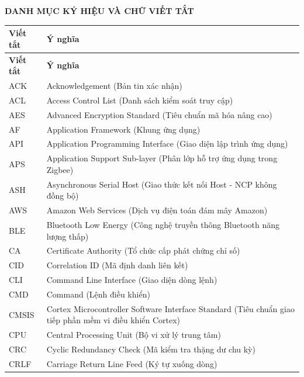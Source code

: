 \begin{center}
{\fontsize{18pt}{22pt}\selectfont\bfseries DANH MỤC KÝ HIỆU VÀ CHỮ VIẾT TẮT}
\end{center}
 {}
\label{sec:acronyms}
\vspace{0.5cm}

\small
\begin{longtable}{|l|p{12cm}|}
\hline
\textbf{Viết tắt} & \textbf{Ý nghĩa} \\ \hline
\endfirsthead
\hline
\textbf{Viết tắt} & \textbf{Ý nghĩa} \\ \hline
\endhead
\hline
\endfoot
ACK & Acknowledgement (Bản tin xác nhận) \\ \hline
ACL & Access Control List (Danh sách kiểm soát truy cập) \\ \hline
AES & Advanced Encryption Standard (Tiêu chuẩn mã hóa nâng cao) \\ \hline
AF & Application Framework (Khung ứng dụng) \\ \hline
API & Application Programming Interface (Giao diện lập trình ứng dụng) \\ \hline
APS & Application Support Sub-layer (Phân lớp hỗ trợ ứng dụng trong Zigbee) \\ \hline
ASH & Asynchronous Serial Host (Giao thức kết nối Host - NCP không đồng bộ) \\ \hline
AWS & Amazon Web Services (Dịch vụ điện toán đám mây Amazon) \\ \hline
BLE & Bluetooth Low Energy (Công nghệ truyền thông Bluetooth năng lượng thấp) \\ \hline
CA & Certificate Authority (Tổ chức cấp phát chứng chỉ số) \\ \hline
CID & Correlation ID (Mã định danh liên kết) \\ \hline
CLI & Command Line Interface (Giao diện dòng lệnh) \\ \hline
CMD & Command (Lệnh điều khiển) \\ \hline
CMSIS & Cortex Microcontroller Software Interface Standard (Tiêu chuẩn giao tiếp phần mềm vi điều khiển Cortex) \\ \hline
CPU & Central Processing Unit (Bộ vi xử lý trung tâm) \\ \hline
CRC & Cyclic Redundancy Check (Mã kiểm tra thặng dư chu kỳ) \\ \hline
CRLF & Carriage Return Line Feed (Ký tự xuống dòng) \\ \hline

\end{longtable}
